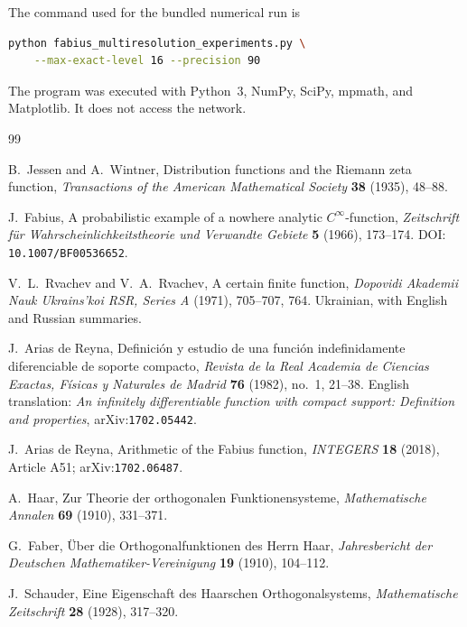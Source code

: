 \documentclass[11pt]{article}
\theoremstyle{definition}
\theoremstyle{remark}
\begin{document}
The command used for the bundled numerical run is
\begin{lstlisting}[language=bash]
python fabius_multiresolution_experiments.py \
    --max-exact-level 16 --precision 90
\end{lstlisting}
The program was executed with Python~3, NumPy, SciPy, mpmath, and Matplotlib.
It does not access the network.

\begin{thebibliography}{99}

B.~Jessen and A.~Wintner,
\newblock Distribution functions and the Riemann zeta function,
\newblock \emph{Transactions of the American Mathematical Society}
  \textbf{38} (1935), 48--88.

J.~Fabius,
\newblock A probabilistic example of a nowhere analytic $C^\infty$-function,
\newblock \emph{Zeitschrift für Wahrscheinlichkeitstheorie und Verwandte Gebiete}
  \textbf{5} (1966), 173--174.
\newblock DOI: \nolinkurl{10.1007/BF00536652}.

V.~L.~Rvachev and V.~A.~Rvachev,
\newblock A certain finite function,
\newblock \emph{Dopovidi Akademii Nauk Ukrains'koi RSR, Series A}
  (1971), 705--707, 764.  Ukrainian, with English and Russian summaries.

J.~Arias de Reyna,
\newblock Definición y estudio de una función indefinidamente diferenciable de
  soporte compacto,
\newblock \emph{Revista de la Real Academia de Ciencias Exactas, Físicas y
  Naturales de Madrid} \textbf{76} (1982), no.~1, 21--38.
\newblock English translation: \emph{An infinitely differentiable function
  with compact support: Definition and properties}, arXiv:\nolinkurl{1702.05442}.

J.~Arias de Reyna,
\newblock Arithmetic of the Fabius function,
\newblock \emph{INTEGERS} \textbf{18} (2018), Article A51;
  arXiv:\nolinkurl{1702.06487}.

A.~Haar,
\newblock Zur Theorie der orthogonalen Funktionensysteme,
\newblock \emph{Mathematische Annalen} \textbf{69} (1910), 331--371.

G.~Faber,
\newblock Über die Orthogonalfunktionen des Herrn Haar,
\newblock \emph{Jahresbericht der Deutschen Mathematiker-Vereinigung}
  \textbf{19} (1910), 104--112.

J.~Schauder,
\newblock Eine Eigenschaft des Haarschen Orthogonalsystems,
\newblock \emph{Mathematische Zeitschrift} \textbf{28} (1928), 317--320.


\end{thebibliography}
\end{document}
